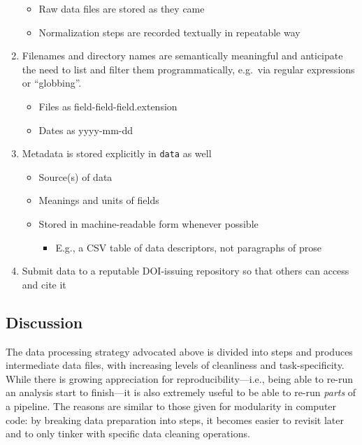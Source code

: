 \documentclass[10pt]{article}
\begin{document}
\begin{enumerate}
  \begin{itemize}
  \item
    Raw data files are stored as they came
  \item
    Normalization steps are recorded textually in repeatable way
  \end{itemize}
\item
  Filenames and directory names are semantically meaningful and
  anticipate the need to list and filter them programmatically, e.g.~via
  regular expressions or ``globbing''.

  \begin{itemize}
  \item
    Files as field-field-field.extension
  \item
    Dates as yyyy-mm-dd
  \end{itemize}
\item
  Metadata is stored explicitly in \texttt{data} as well

  \begin{itemize}
  \item
    Source(s) of data
  \item
    Meanings and units of fields
  \item
    Stored in machine-readable form whenever possible

    \begin{itemize}
      \item
      E.g., a CSV table of data descriptors, not paragraphs of prose
    \end{itemize}
  \end{itemize}
\item
  Submit data to a reputable DOI-issuing repository so that others can
  access and cite it
\end{enumerate}

\subsection*{Discussion}

The data processing strategy advocated above is divided into steps and
produces intermediate data files, with increasing levels of cleanliness
and task-specificity. While there is growing appreciation for
reproducibility---i.e., being able to re-run an analysis start to
finish---it is also extremely useful to be able to re-run \emph{parts}
of a pipeline. The reasons are similar to those given for modularity in
computer code: by breaking data preparation into steps, it becomes
easier to revisit later and to only tinker with specific data cleaning
operations.
\end{document}
